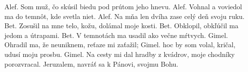 Alef.
Som muž, čo skúsil biedu
pod prútom jeho hnevu.
\versseparator
Alef.
Vohnal a voviedol ma
do temnôt, kde svetla niet.
\versseparator
Alef.
Na mňa len dvíha zase
celý deň svoju ruku.
\versseparator
Bet.
Zosušil na mne telo, kožu,
dolámal moje kosti.
\versseparator
Bet.
Obklopil, obkľúčil ma
jedom a útrapami.
\versseparator
Bet.
V temnotách ma usadil
ako večne mŕtvych.
\versseparator
Gimel.
Ohradil ma, že neuniknem,
reťaze mi zaťažil;
\versseparator
Gimel.
hoc by som volal, kričal,
udusí moju prosbu.
\versseparator
Gimel.
Na cesty mi dal hradby z kvádrov,
moje chodníky porozvracal.
\versseparator
Jeruzalem, navráť sa k Pánovi, svojmu Bohu.